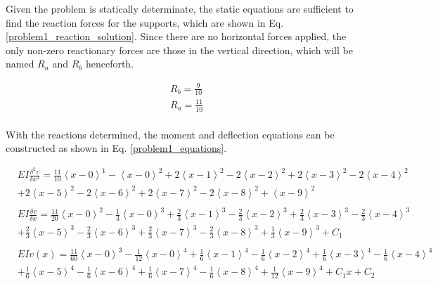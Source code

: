 \documentclass[a4paper]{article}
\begin{document}
Given the problem is statically determinate, the static equations are sufficient to find the reaction forces for the supports, which are shown in Eq. \ref{problem1_reaction_solution}. Since there are no horizontal forces applied, the only non-zero reactionary forces are those in the vertical direction, which will be named $R_a$ and $R_b$ henceforth.

\begin{equation}
\begin{split}
	& R_b = \frac{9}{10} \\
	& R_a = \frac{11}{10} \\
\end{split}
\label{problem1_reaction_solution}
\end{equation}

With the reactions determined, the moment and deflection equations can be constructed as shown in Eq. \ref{problem1_equations}.

\begin{equation}
    \begin{split}
& EI \frac{\delta^2 v}{\delta x^2} = \frac{11}{10}\left<x-0\right>^1 - \left<x-0\right>^2 +  2\left<x-1\right>^2 - 2\left<x-2\right>^2 +  2\left<x-3\right>^2 - 2\left<x-4\right>^2  \\
& +  2\left<x-5\right>^2 - 2\left<x-6\right>^2  +  2\left<x-7\right>^2 - 2\left<x-8\right>^2 + \left <x-9\right>^2 \\
& \\
& EI \frac{\delta v}{\delta x} =  \frac{11}{20}\left<x-0\right>^2 - \frac{1}{3}\left<x-0\right>^3 +  \frac{2}{3}\left<x-1\right>^3 - \frac{2}{3}\left<x-2\right>^3 +  \frac{2}{3}\left<x-3\right>^3 - \frac{2}{3}\left<x-4\right>^3 \\
&  +  \frac{2}{3}\left<x-5\right>^3 - \frac{2}{3}\left<x-6\right>^3  +  \frac{2}{3}\left<x-7\right>^3 - \frac{2}{3}\left<x-8\right>^3 +  \frac{1}{3}\left<x-9\right>^3 + C_1\\
& \\
& EI v(x) = \frac{11}{60}\left<x-0\right>^3 - \frac{1}{12}\left<x-0\right>^4 +  \frac{1}{6}\left<x-1\right>^4 - \frac{1}{6}\left<x-2\right>^4 + \frac{1}{6}\left<x-3\right>^4 - \frac{1}{6}\left<x-4\right>^4  \\      
& +  \frac{1}{6}\left<x-5\right>^4 - \frac{1}{6}\left<x-6\right>^4  +  \frac{1}{6}\left<x-7\right>^4 - \frac{1}{6}\left<x-8\right>^4 +  \frac{1}{12}\left<x-9\right>^4 + C_1x + C_2 \\
    \end{split}
\label{problem1_equations}
\end{equation}
\end{document}

